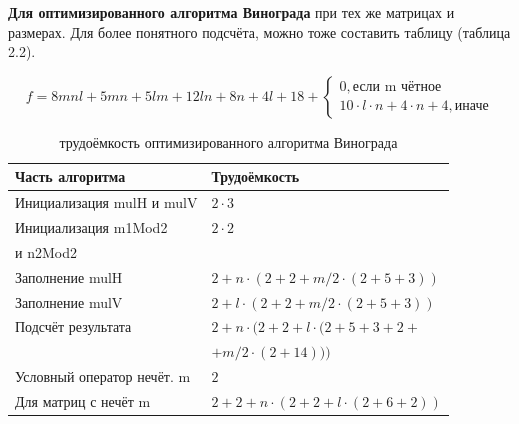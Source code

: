 \documentclass[12pt,a4paper]{report}
\begin{document}
\textbf{Для оптимизированного алгоритма Винограда} при тех же матрицах и размерах. 
Для более понятного подсчёта, можно тоже составить таблицу (таблица 2.2).

\begin{displaymath}
	f = 8mnl + 5mn + 5lm + 12ln + 8n + 4l + 18 + \left \{ 
	\begin{array}{ll}  
		0, \textrm{если m чётное} \\ 
		10 \cdot l \cdot n + 4 \cdot n + 4, \textrm{иначе} 
	\end{array} \right.
\end{displaymath}

\begin{table}[h]
	\caption{трудоёмкость оптимизированного алгоритма Винограда}  
	\label{tabular:timesandtenses}
	\begin{center}
		\begin{tabular}{ | l | l | }
			\hline
			Часть алгоритма               & Трудоёмкость                                                            \\ \hline
			Инициализация mulH и mulV     & $2 \cdot 3$                                                             \\ \hline
			Инициализация m1Mod2          & $2 \cdot 2$                                                             \\
			и n2Mod2                      &                                                                         \\ \hline
			Заполнение mulH               & $2 + n \cdot (2 + 2 + m / 2 \cdot (2 + 5 + 3))$                         \\ \hline
			Заполнение mulV               & $2 + l \cdot (2 + 2 + m / 2 \cdot (2 + 5 + 3))$                         \\ \hline
			Подсчёт результата            & $2 + n \cdot (2 + 2 + l \cdot (2 + 5 + 3 + 2 + $                        \\
			& $ + m / 2 \cdot (2 + 14)))$                                             \\ \hline
			Условный оператор нечёт. m    & $2$                                                                     \\ \hline
			Для матриц с нечёт m          & $2 + 2 + n \cdot (2 + 2 + l \cdot (2 + 6 + 2))$                         \\ \hline
		\end{tabular}
	\end{center}
\end{table}
\end{document}

